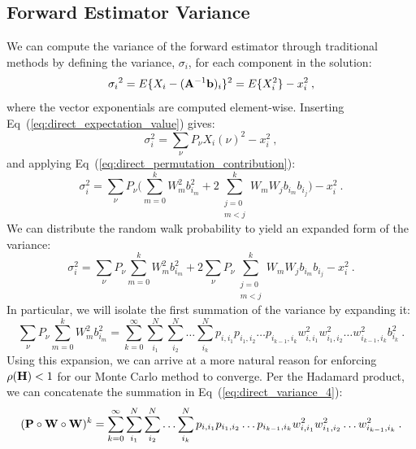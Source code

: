\subsection{Forward Estimator Variance}
\label{subsec:forward_variance}
We can compute the variance of the forward estimator through traditional
methods by defining the variance, $\sigma_i$, for each component in
the solution:
\begin{equation}
  {\sigma_i}^2 = E\{X_i - (\mathbf{A}^{-1}\mathbf{b})_i\}^2 = E\{X_i^2\} - x_i^2\:,
  \label{eq:direct_variance_1}
\end{equation}
where the vector exponentials are computed element-wise. Inserting
Eq~(\ref{eq:direct_expectation_value}) gives:
\begin{equation}
  \sigma_i^2 = \sum_{\nu} P_{\nu} X_{i}(\nu)^2 - x_i^2\:,
  \label{eq:direct_variance_2}
\end{equation}
and applying Eq~(\ref{eq:direct_permutation_contribution}):
\begin{equation}
  \sigma_i^2 = \sum_{\nu} P_{\nu} \Big(\sum_{m=0}^k W_{m}^2 b_{i_m}^2
  + 2 \sum_{\substack{ j=0 \\ m<j}}^k W_m W_j b_{i_m} b_{i_j} \Big)-
  x_i^2\:.
  \label{eq:direct_variance_3}
\end{equation}
We can distribute the random walk probability to yield an expanded
form of the variance:
\begin{equation}
  \sigma_i^2 = \sum_{\nu} P_{\nu} \sum_{m=0}^k W_{m}^2 b_{i_m}^2 + 2
  \sum_{\nu} P_{\nu} \sum_{\substack{ j=0 \\ m<j}}^k W_m W_j b_{i_m}
  b_{i_j} - x_i^2\:.
  \label{eq:direct_variance_3_2}
\end{equation}
In particular, we will isolate the first summation of the variance by
expanding it:
\begin{equation}
  \sum_{\nu} P_{\nu} \sum_{m=0}^k W_{m}^2 b_{i_m}^2 =
  \sum_{k=0}^{\infty}\sum_{i_1}^{N}\sum_{i_2}^{N}\ldots \sum_{i_k}^{N}
  p_{i,i_1}p_{i_1,i_2}\ldots p_{i_{k-1},i_k}
  w^2_{i,i_1}w^2_{i_1,i_2}\ldots w^2_{i_{k-1},i_k} b_{i_k}^2\:.
  \label{eq:direct_variance_4}
\end{equation}
Using this expansion, we can arrive at a more natural
reason for enforcing $\rho(\mathbf{H}) < 1$ for our Monte Carlo method to
converge. Per the Hadamard product, we can concatenate the summation
in Eq~(\ref{eq:direct_variance_4}):
\begin{equation}
  (\mathbf{P} \circ \mathbf{W} \circ \mathbf{W})^k =
  \sum_{k=0}^{\infty}\sum_{i_1}^{N}\sum_{i_2}^{N}\ldots \sum_{i_k}^{N}
  p_{i,i_1}p_{i_1,i_2}\ldots p_{i_{k-1},i_k}
  w^2_{i,i_1}w^2_{i_1,i_2}\ldots w^2_{i_{k-1},i_k}\:.
  \label{eq:double_weighted_decomposition}
\end{equation}
